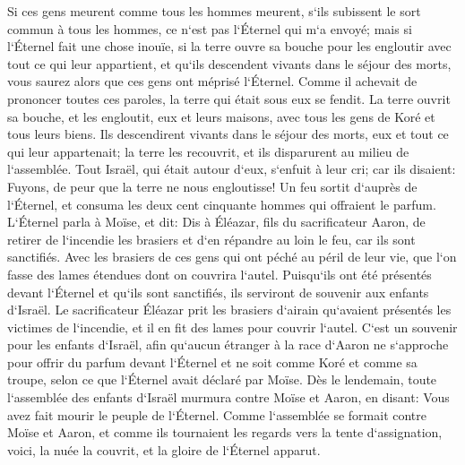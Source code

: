 \verse Si ces gens meurent comme tous les hommes meurent, s`ils subissent le sort commun à tous les hommes, ce n`est pas l`Éternel qui m`a envoyé; 
\verse mais si l`Éternel fait une chose inouïe, si la terre ouvre sa bouche pour les engloutir avec tout ce qui leur appartient, et qu`ils descendent vivants dans le séjour des morts, vous saurez alors que ces gens ont méprisé l`Éternel. 
\verse Comme il achevait de prononcer toutes ces paroles, la terre qui était sous eux se fendit. 
\verse La terre ouvrit sa bouche, et les engloutit, eux et leurs maisons, avec tous les gens de Koré et tous leurs biens. 
\verse Ils descendirent vivants dans le séjour des morts, eux et tout ce qui leur appartenait; la terre les recouvrit, et ils disparurent au milieu de l`assemblée. 
\verse Tout Israël, qui était autour d`eux, s`enfuit à leur cri; car ils disaient: Fuyons, de peur que la terre ne nous engloutisse! 
\verse Un feu sortit d`auprès de l`Éternel, et consuma les deux cent cinquante hommes qui offraient le parfum. 
\verse L`Éternel parla à Moïse, et dit: 
\verse Dis à Éléazar, fils du sacrificateur Aaron, de retirer de l`incendie les brasiers et d`en répandre au loin le feu, car ils sont sanctifiés. 
\verse Avec les brasiers de ces gens qui ont péché au péril de leur vie, que l`on fasse des lames étendues dont on couvrira l`autel. Puisqu`ils ont été présentés devant l`Éternel et qu`ils sont sanctifiés, ils serviront de souvenir aux enfants d`Israël. 
\verse Le sacrificateur Éléazar prit les brasiers d`airain qu`avaient présentés les victimes de l`incendie, et il en fit des lames pour couvrir l`autel. 
\verse C`est un souvenir pour les enfants d`Israël, afin qu`aucun étranger à la race d`Aaron ne s`approche pour offrir du parfum devant l`Éternel et ne soit comme Koré et comme sa troupe, selon ce que l`Éternel avait déclaré par Moïse. 
\verse Dès le lendemain, toute l`assemblée des enfants d`Israël murmura contre Moïse et Aaron, en disant: Vous avez fait mourir le peuple de l`Éternel. 
\verse Comme l`assemblée se formait contre Moïse et Aaron, et comme ils tournaient les regards vers la tente d`assignation, voici, la nuée la couvrit, et la gloire de l`Éternel apparut. 
